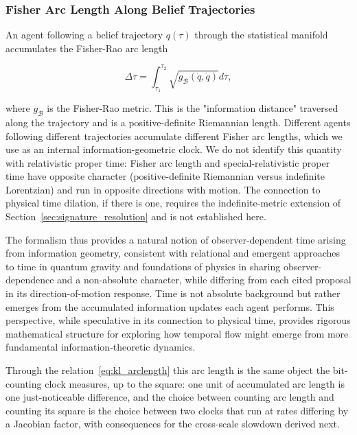 \documentclass[11pt]{article}
\begin{document}
\subsubsection{Fisher Arc Length Along Belief Trajectories}
\label{sec:fisher_arc_length}

An agent following a belief trajectory $q(\tau)$ through the statistical manifold accumulates the Fisher-Rao arc length

\begin{equation}
\Delta \tau = \int_{\tau_1}^{\tau_2} \sqrt{g_{\mathcal{B}}(\dot{q}, \dot{q})}  d\tau,
\end{equation}

where $g_{\mathcal{B}}$ is the Fisher-Rao metric. This is the "information distance" traversed along the trajectory and is a positive-definite Riemannian length. Different agents following different trajectories accumulate different Fisher arc lengths, which we use as an internal information-geometric clock. We do not identify this quantity with relativistic proper time: Fisher arc length and special-relativistic proper time have opposite character (positive-definite Riemannian versus indefinite Lorentzian) and run in opposite directions with motion. The connection to physical time dilation, if there is one, requires the indefinite-metric extension of Section~\ref{sec:signature_resolution} and is not established here.

The formalism thus provides a natural notion of observer-dependent time arising from information geometry, consistent with relational and emergent approaches to time in quantum gravity and foundations of physics in sharing observer-dependence and a non-absolute character, while differing from each cited proposal in its direction-of-motion response. Time is not absolute background but rather emerges from the accumulated information updates each agent performs. This perspective, while speculative in its connection to physical time, provides rigorous mathematical structure for exploring how temporal flow might emerge from more fundamental information-theoretic dynamics.

Through the relation~\eqref{eq:kl_arclength} this arc length is the same object the bit-counting clock measures, up to the square: one unit of accumulated arc length is one just-noticeable difference, and the choice between counting arc length and counting its square is the choice between two clocks that run at rates differing by a Jacobian factor, with consequences for the cross-scale slowdown derived next.
\end{document}
